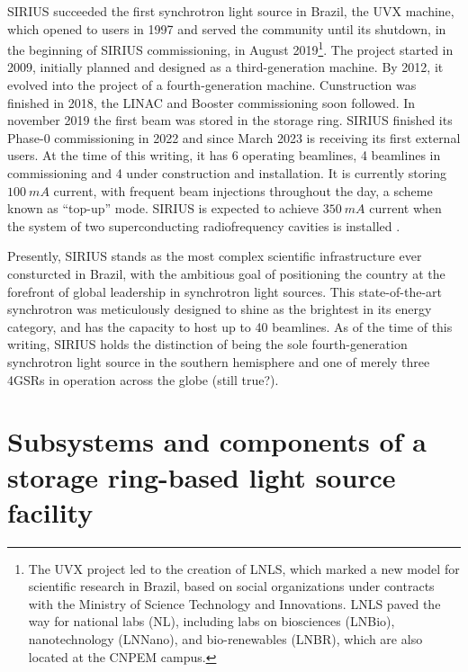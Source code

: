 SIRIUS succeeded the first synchrotron light source in Brazil, the UVX machine, which opened to users in 1997 and served the community until its shutdown, in the beginning of SIRIUS commissioning, in August 2019\footnote{The UVX project led to the creation of LNLS, which marked a new model for scientific research in Brazil, based on social organizations under contracts with the Ministry of Science Technology and Innovations. LNLS paved the way for national labs (NL), including labs on biosciences (LNBio), nanotechnology (LNNano), and bio-renewables (LNBR), which are also located at the CNPEM campus.}\cite{liu_synchrotron_2019}. The project started in 2009, initially planned and designed as a third-generation machine. By 2012, it evolved into the project of a fourth-generation machine\cite{liu_synchrotron_2019}. Cunstruction was finished in 2018, the LINAC and Booster commissioning soon followed. In november 2019 the first beam was stored in the storage ring.
SIRIUS finished its Phase-0 commissioning in 2022 and since March 2023 is receiving its first external users. At the time of this writing, it has 6 operating beamlines, 4 beamlines in commissioning and 4 under construction and installation. It is currently storing $100~\unit{mA}$ current, with frequent beam injections throughout the day, a scheme known as ``top-up'' mode. SIRIUS is expected to achieve $350~\unit{mA}$ current when the system of two superconducting radiofrequency cavities is installed \cite{liu_status_2022,liu_status_2023}.

Presently, SIRIUS stands as the most complex scientific infrastructure ever consturcted in Brazil, with the ambitious goal of positioning the country at the forefront of global leadership in synchrotron light sources. This state-of-the-art synchrotron was meticulously designed to shine as the brightest in its energy category, and has the capacity to host up to 40 beamlines. As of the time of this writing, SIRIUS holds the distinction of being the sole fourth-generation synchrotron light source in the southern hemisphere and one of merely three 4GSRs in operation across the globe (still true?).

\section{Subsystems and components of a storage ring-based light source facility}

